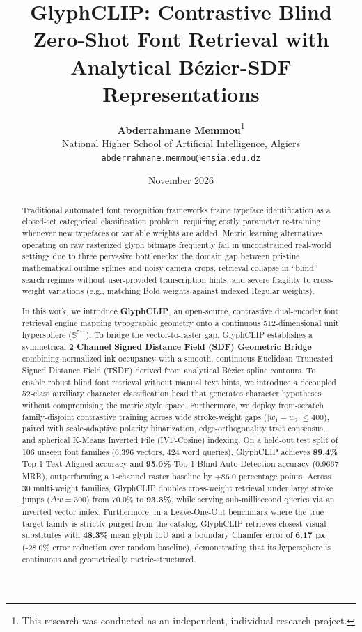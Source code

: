 \documentclass[10pt,twocolumn,letterpaper]{article}
\title{\textbf{GlyphCLIP: Contrastive Blind Zero-Shot Font Retrieval with Analytical B\'ezier-SDF Representations}}
\author{
  \textbf{Abderrahmane Memmou}\thanks{This research was conducted as an independent, individual research project.} \\
  National Higher School of Artificial Intelligence, Algiers \\
  \texttt{abderrahmane.memmou@ensia.edu.dz}
}
\date{November 2026}
\begin{document}
\maketitle

\begin{abstract}
Traditional automated font recognition frameworks frame typeface identification as a closed-set categorical classification problem, requiring costly parameter re-training whenever new typefaces or variable weights are added. Metric learning alternatives operating on raw rasterized glyph bitmaps frequently fail in unconstrained real-world settings due to three pervasive bottlenecks: the domain gap between pristine mathematical outline splines and noisy camera crops, retrieval collapse in ``blind'' search regimes without user-provided transcription hints, and severe fragility to cross-weight variations (e.g., matching Bold weights against indexed Regular weights).

In this work, we introduce \textbf{GlyphCLIP}, an open-source, contrastive dual-encoder font retrieval engine mapping typographic geometry onto a continuous 512-dimensional unit hypersphere ($\mathbb{S}^{511}$). To bridge the vector-to-raster gap, GlyphCLIP establishes a symmetrical \textbf{2-Channel Signed Distance Field (SDF) Geometric Bridge} combining normalized ink occupancy with a smooth, continuous Euclidean Truncated Signed Distance Field (TSDF) derived from analytical B\'ezier spline contours. To enable robust blind font retrieval without manual text hints, we introduce a decoupled 52-class auxiliary character classification head that generates character hypotheses without compromising the metric style space. Furthermore, we deploy from-scratch family-disjoint contrastive training across wide stroke-weight gaps ($|w_1 - w_2| \le 400$), paired with scale-adaptive polarity binarization, edge-orthogonality trait consensus, and spherical K-Means Inverted File (IVF-Cosine) indexing. On a held-out test split of 106 unseen font families (6,396 vectors, 424 word queries), GlyphCLIP achieves \textbf{89.4\%} Top-1 Text-Aligned accuracy and \textbf{95.0\%} Top-1 Blind Auto-Detection accuracy (0.9667 MRR), outperforming a 1-channel raster baseline by +86.0 percentage points. Across 30 multi-weight families, GlyphCLIP doubles cross-weight retrieval under large stroke jumps ($\Delta w = 300$) from 70.0\% to \textbf{93.3\%}, while serving sub-millisecond queries via an inverted vector index. Furthermore, in a Leave-One-Out benchmark where the true target family is strictly purged from the catalog, GlyphCLIP retrieves closest visual substitutes with \textbf{48.3\%} mean glyph IoU and a boundary Chamfer error of \textbf{6.17 px} (-28.0\% error reduction over random baseline), demonstrating that its hypersphere is continuous and geometrically metric-structured.
\end{abstract}
\end{document}
